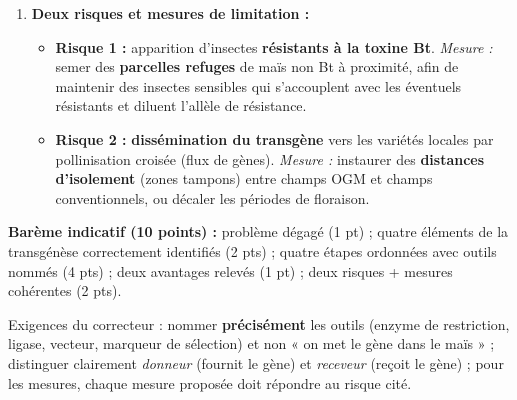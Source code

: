 \documentclass[11pt]{article}
\begin{document}
\begin{corrige}
\begin{enumerate}
\begin{itemize}
\item \textbf{rendements plus élevés} (moins de pertes dues au ravageur).
\end{itemize}
\item \textbf{Deux risques et mesures de limitation :}
\begin{itemize}
\item \textbf{Risque 1 :} apparition d'insectes \textbf{résistants à la toxine Bt}. \emph{Mesure :} semer des \textbf{parcelles refuges} de maïs non Bt à proximité, afin de maintenir des insectes sensibles qui s'accouplent avec les éventuels résistants et diluent l'allèle de résistance.
\item \textbf{Risque 2 :} \textbf{dissémination du transgène} vers les variétés locales par pollinisation croisée (flux de gènes). \emph{Mesure :} instaurer des \textbf{distances d'isolement} (zones tampons) entre champs OGM et champs conventionnels, ou décaler les périodes de floraison.
\end{itemize}
\end{enumerate}
\textbf{Barème indicatif (10 points) :} problème dégagé (1 pt) ; quatre éléments de la transgénèse correctement identifiés (2 pts) ; quatre étapes ordonnées avec outils nommés (4 pts) ; deux avantages relevés (1 pt) ; deux risques + mesures cohérentes (2 pts).
\begin{attention}
Exigences du correcteur : nommer \textbf{précisément} les outils (enzyme de restriction, ligase, vecteur, marqueur de sélection) et non « on met le gène dans le maïs » ; distinguer clairement \emph{donneur} (fournit le gène) et \emph{receveur} (reçoit le gène) ; pour les mesures, chaque mesure proposée doit répondre au risque cité.
\end{attention}
\end{corrige}
\end{document}
